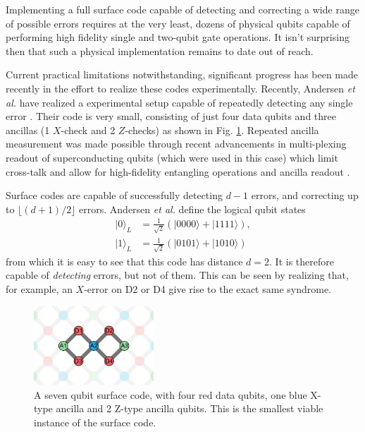 Implementing a full surface code capable of detecting and correcting a wide
range of possible errors requires at the very least, dozens of physical qubits
capable of performing high fidelity single and two-qubit gate operations. It
isn't surprising then that such a physical implementation remains to date out of
reach. 

Current practical limitations notwithstanding, significant progress has been
made recently in the effort to realize these codes experimentally. Recently,
Andersen \textit{et al.} have realized a experimental setup capable of
repeatedly detecting any single error \cite{Andersen_2020}. Their code is very
small, consisting of just four data qubits and three ancillas (1 $X$-check and 2
$Z$-checks) as shown in Fig. \ref{fig:seven_qbit_code}. Repeated ancilla
measurement was made possible through recent advancements in multi-plexing
readout of superconducting qubits (which were used in this case) which limit
cross-talk and allow for high-fidelity entangling operations and ancilla readout
\cite{barends14_super_quant_circuit_at_surfac} \cite{Bultink_2020}.

Surface codes are capable of successfully detecting $d-1$ errors, and correcting
up to $\lfloor{(d+1)/2} \rfloor$ errors. Andersen \textit{et al.} define the
logical qubit states
\begin{align}
|0\rangle_L &= \frac{1}{\sqrt{2}} (|0000\rangle + |1111\rangle) , \\
|1\rangle_L &= \frac{1}{\sqrt{2}} (|0101\rangle + |1010\rangle) 
\end{align}
from which it is easy to see that this code has distance $d=2$. It is therefore
capable of \textit{detecting} errors, but not of  them. This
can be seen by realizing that, for example, an $X$-error on D2 or D4 give rise
to the exact same syndrome.

\begin{figure}
  \centering
  \includegraphics[width=0.4\textwidth]{images/seven_qbit_code.png}
  \caption{A seven qubit surface code, with four red data qubits, one blue
    X-type ancilla and 2 Z-type ancilla qubits. This is the smallest viable
    instance of the surface code.}
  \label{fig:seven_qbit_code}
\end{figure}

